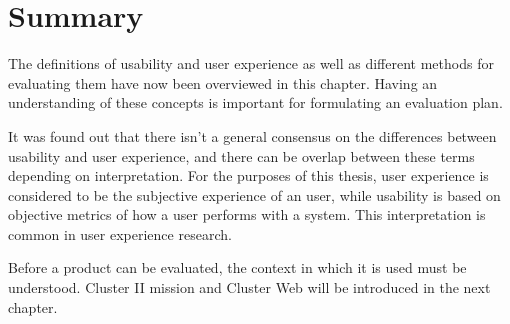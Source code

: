 \section{Summary}
The definitions of usability and user experience as well as different methods for evaluating them have now been overviewed in this chapter. Having an understanding of these concepts is important for formulating an evaluation plan. 

It was found out that there isn't a general consensus on the differences between usability and user experience, and there can be overlap between these terms depending on interpretation. For the purposes of this thesis, user experience is considered to be the subjective experience of an user, while usability is based on objective metrics of how a user performs with a system. This interpretation is common in user experience research.

Before a product can be evaluated, the context in which it is used must be understood. Cluster II mission and Cluster Web will be introduced in the next chapter.